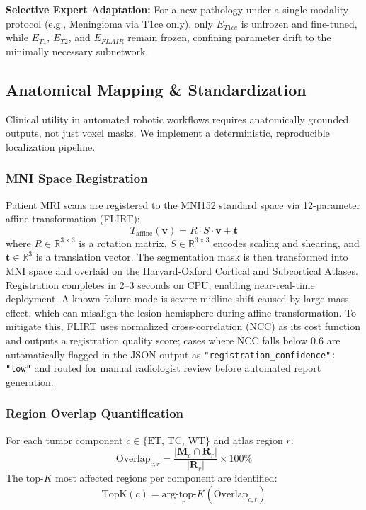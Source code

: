 \documentclass[conference]{IEEEtran}
\begin{document}
\textbf{Selective Expert Adaptation:} For a new pathology under a single modality protocol (e.g., Meningioma via T1ce only), only $E_{T1ce}$ is unfrozen and fine-tuned, while $E_{T1}$, $E_{T2}$, and $E_{FLAIR}$ remain frozen, confining parameter drift to the minimally necessary subnetwork.

\subsection{Anatomical Mapping \& Standardization}

Clinical utility in automated robotic workflows requires anatomically grounded outputs, not just voxel masks. We implement a deterministic, reproducible localization pipeline.

\subsubsection{MNI Space Registration}
Patient MRI scans are registered to the MNI152 standard space via 12-parameter affine transformation (FLIRT):
\begin{equation}
T_{\text{affine}}(\mathbf{v}) = R \cdot S \cdot \mathbf{v} + \mathbf{t}
\end{equation}
where $R \in \mathbb{R}^{3\times3}$ is a rotation matrix, $S \in \mathbb{R}^{3\times3}$ encodes scaling and shearing, and $\mathbf{t} \in \mathbb{R}^3$ is a translation vector. The segmentation mask is then transformed into MNI space and overlaid on the Harvard-Oxford Cortical and Subcortical Atlases. Registration completes in 2--3 seconds on CPU, enabling near-real-time deployment. A known failure mode is severe midline shift caused by large mass effect, which can misalign the lesion hemisphere during affine transformation. To mitigate this, FLIRT uses normalized cross-correlation (NCC) as its cost function and outputs a registration quality score; cases where NCC falls below 0.6 are automatically flagged in the JSON output as \texttt{"registration\_confidence": "low"} and routed for manual radiologist review before automated report generation.

\subsubsection{Region Overlap Quantification}
For each tumor component $c \in \{\text{ET},\,\text{TC},\,\text{WT}\}$ and atlas region $r$:
\begin{equation}
\text{Overlap}_{c,r} = \frac{|\mathbf{M}_c \cap \mathbf{R}_r|}{|\mathbf{R}_r|} \times 100\%
\end{equation}
The top-$K$ most affected regions per component are identified:
\begin{equation}
\text{TopK}(c) = \underset{r}{\text{arg-top-}K}\left(\text{Overlap}_{c,r}\right)
\end{equation}
\end{document}
